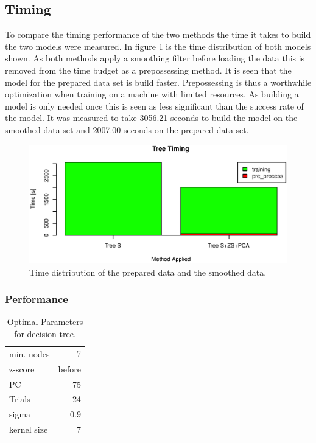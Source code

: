 \subsection{Timing}
To compare the timing performance of the two methods the time it takes to build the two models were measured.
In figure \ref{fig:tree_time_distribution} is the time distribution of both models shown.
As both methods apply a smoothing filter before loading the data this is removed from the time budget as a prepossessing method.
It is seen that the model for the prepared data set is build faster.
Prepossessing is thus a worthwhile optimization when training on a machine with limited resources.
As building a model is only needed once this is seen as less significant than the success rate of the model.
It was measured to take 3056.21 seconds to build the model on the smoothed data set and 2007.00 seconds on the prepared data set.

\begin{figure}[H]
\centering
\includegraphics[width=\textwidth]{graphics/algo_compare_timing_tree}
\caption{Time distribution of the prepared data and the smoothed data.}
\label{fig:tree_time_distribution}
\end{figure}

\subsubsection{Performance}

\begin{table}[h]
\centering
\begin{tabular}{lr}
min. nodes  & 7      \\
z-score     & before \\
PC          & 75     \\
Trials      & 24     \\
sigma       & 0.9    \\
kernel size & 7      \\
\end{tabular}
\caption{Optimal Parameters for decision tree.}
\label{tb:tree_simply_the_best_parameters}
\end{table}

